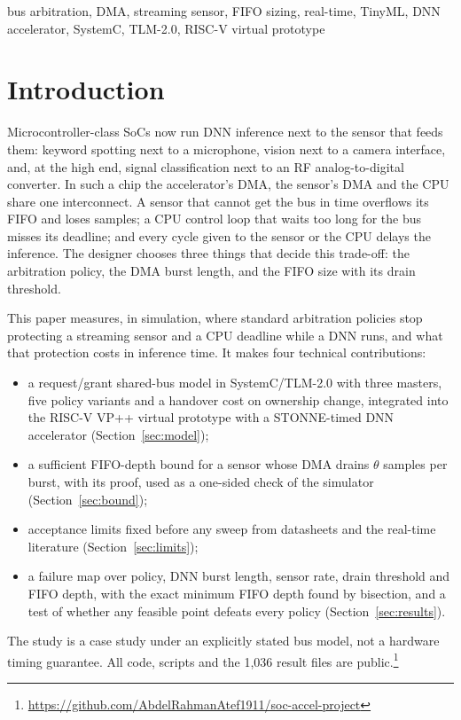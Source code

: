 \documentclass[conference]{IEEEtran}
\begin{document}
\begin{IEEEkeywords}
bus arbitration, DMA, streaming sensor, FIFO sizing, real-time, TinyML, DNN accelerator, SystemC, TLM-2.0, RISC-V virtual prototype
\end{IEEEkeywords}

\section{Introduction}
Microcontroller-class SoCs now run DNN inference next to the sensor that feeds them: keyword spotting next to a microphone, vision next to a camera interface, and, at the high end, signal classification next to an RF analog-to-digital converter. In such a chip the accelerator's DMA, the sensor's DMA and the CPU share one interconnect. A sensor that cannot get the bus in time overflows its FIFO and loses samples; a CPU control loop that waits too long for the bus misses its deadline; and every cycle given to the sensor or the CPU delays the inference. The designer chooses three things that decide this trade-off: the arbitration policy, the DMA burst length, and the FIFO size with its drain threshold.

This paper measures, in simulation, where standard arbitration policies stop protecting a streaming sensor and a CPU deadline while a DNN runs, and what that protection costs in inference time. It makes four technical contributions:
\begin{itemize}
\item a request/grant shared-bus model in SystemC/TLM-2.0 with three masters, five policy variants and a handover cost on ownership change, integrated into the RISC-V VP++ virtual prototype with a STONNE-timed DNN accelerator (Section~\ref{sec:model});
\item a sufficient FIFO-depth bound for a sensor whose DMA drains $\theta$ samples per burst, with its proof, used as a one-sided check of the simulator (Section~\ref{sec:bound});
\item acceptance limits fixed before any sweep from datasheets and the real-time literature (Section~\ref{sec:limits});
\item a failure map over policy, DNN burst length, sensor rate, drain threshold and FIFO depth, with the exact minimum FIFO depth found by bisection, and a test of whether any feasible point defeats every policy (Section~\ref{sec:results}).
\end{itemize}
The study is a case study under an explicitly stated bus model, not a hardware timing guarantee. All code, scripts and the 1{,}036 result files are public.\footnote{\url{https://github.com/AbdelRahmanAtef1911/soc-accel-project}}
\end{document}
